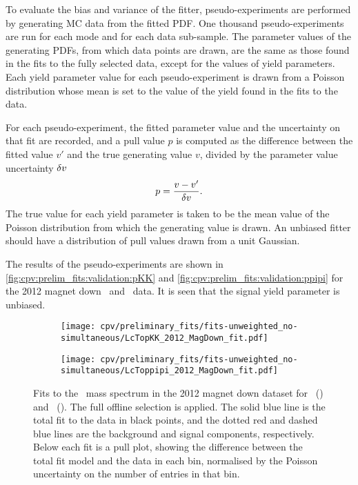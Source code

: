 To evaluate the bias and variance of the fitter, pseudo-experiments are 
performed by generating \ac{MC} data from the fitted \ac{PDF}.
One thousand pseudo-experiments are run for each mode and for each data 
sub-sample.
The parameter values of the generating \acp{PDF}, from which data points are 
drawn, are the same as those found in the fits to the fully selected data, 
except for the values of yield parameters.
Each yield parameter value for each pseudo-experiment is drawn from a Poisson 
distribution whose mean is set to the value of the yield found in the fits to 
the data.

For each pseudo-experiment, the fitted parameter value and the uncertainty on 
that fit are recorded, and a pull value $p$ is computed as the difference 
between the fitted value $v'$ and the true generating value $v$, divided by the 
parameter value uncertainty $\delta{v}$
\begin{equation}
  p = \frac{v - v'}{\delta{v}}.
\end{equation}
The true value for each yield parameter is taken to be the mean value of the 
Poisson distribution from which the generating value is drawn.
An unbiased fitter should have a distribution of pull values drawn from a unit 
Gaussian.

The results of the pseudo-experiments are shown in 
\cref{fig:cpv:prelim_fits:validation:pKK} and 
\cref{fig:cpv:prelim_fits:validation:ppipi} for the 2012 magnet down \pKK\ and 
\ppipi\ data.
It is seen that the signal yield parameter is unbiased.

\begin{figure}
  \begin{subfigure}[b]{0.5\textwidth}
    \texttt{[image: cpv/preliminary\_fits/fits-unweighted\_no-simultaneous/LcTopKK\_2012\_MagDown\_fit.pdf]}
    \caption{\pKK}
    \label{fig:cpv:prelim_fits:full:pKK}
  \end{subfigure}
  \begin{subfigure}[b]{0.5\textwidth}
    \texttt{[image: cpv/preliminary\_fits/fits-unweighted\_no-simultaneous/LcToppipi\_2012\_MagDown\_fit.pdf]}
    \caption{\ppipi}
    \label{fig:cpv:prelim_fits:full:ppipi}
  \end{subfigure}
  \caption{%
    Fits to the \PLambdac\ mass spectrum in the 2012 magnet down dataset for 
    \pKK~() and 
    \ppipi~().
    The full offline selection is applied.
    The solid blue line is the total fit to the data in black points, and the 
    dotted red and dashed blue lines are the background and signal components, 
    respectively.
    Below each fit is a pull plot, showing the difference between the total fit 
    model and the data in each bin, normalised by the Poisson uncertainty on 
    the number of entries in that bin.
  }
  \label{fig:cpv:prelim_fits:full}
\end{figure}

